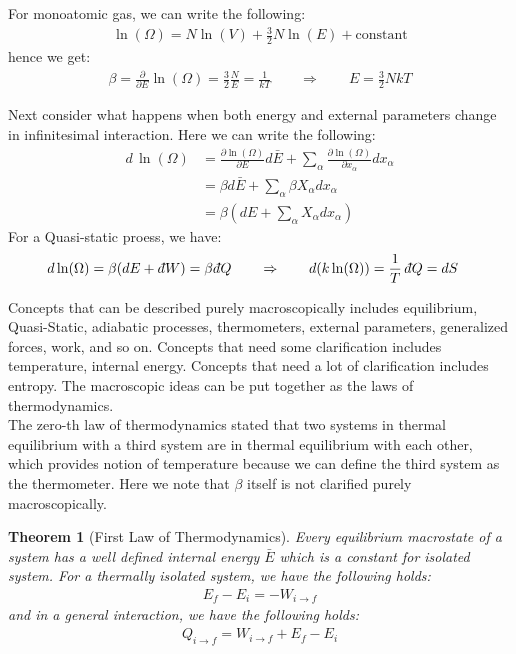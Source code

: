 \documentclass[11pt]{article}
\theoremstyle{break}
\theoremstyle{break}
\newtheorem{thm}{Theorem}[section]
\newcommand{\dbar}{d\hspace*{-0.08em}\bar{}\hspace*{0.1em}}
\begin{document}
For monoatomic gas, we can write the following:
\begin{align*}
\ln(\Omega) = N\ln(V) + \frac{3}{2}N \ln(E) + \text{constant}
\end{align*}
hence we get:
\begin{align*}
\beta = \frac{\partial}{\partial E}\ln(\Omega) = \frac{3}{2}\frac{N}{E} = \frac{1}{kT} \qquad \Rightarrow\qquad E = \frac{3}{2}NkT
\end{align*}


Next consider what happens when both energy and external parameters change in infinitesimal interaction. Here we can write the following:
\begin{align*}
d\,\ln(\Omega)&= \frac{\partial \ln(\Omega)}{\partial E} d\bar{E} + \sum_{\alpha} \frac{\partial \ln(\Omega)}{\partial x_{\alpha}}dx_{\alpha}\\
&= \beta d\bar{E} + \sum_{\alpha} \beta X_{\alpha} dx_{\alpha}\\
&= \beta (dE + \sum_{\alpha} X_{\alpha}dx_{\alpha})
\end{align*}
For a Quasi-static proess, we have:
\begin{align*}
d \ln (\Omega)&= \beta(dE + \dbar W) = \beta \dbar Q \qquad \Rightarrow \qquad d(k\ln(\Omega)) = \frac{1}{T}\, \dbar Q = dS
\end{align*}


Concepts that can be described purely macroscopically includes equilibrium, Quasi-Static, adiabatic processes, thermometers, external parameters, generalized forces, work, and so on. Concepts that need some clarification includes temperature, internal energy. Concepts that need a lot of clarification includes entropy. The macroscopic ideas can be put together as the laws of thermodynamics.\\

The zero-th law of thermodynamics stated that two systems in thermal equilibrium with a third system are in thermal equilibrium with each other, which provides notion of temperature because we can define the third system as the thermometer. Here we note that $\beta$ itself is not clarified purely macroscopically.\\


\begin{thm}[First Law of Thermodynamics]
Every equilibrium macrostate of a system has a well defined internal energy $\bar{E}$ which is a constant for isolated system. For a thermally isolated system, we have the following holds:
\begin{align*}
E_f - E_i = -W_{i \to f}
\end{align*}
and in a general interaction, we have the following holds:
\begin{align*}
Q_{i\to f} = W_{i\to f} + E_f -E_i
\end{align*}
\end{thm}
\end{document}
